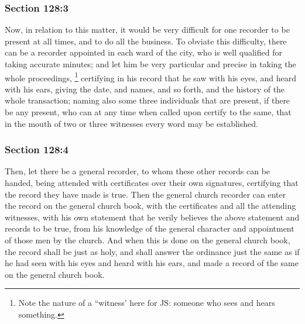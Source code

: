 
	\subsubsection{Section 128:3} %
		\label{DC128-3}

		Now, in relation to this matter, it would be very difficult for one recorder to be present at all times, and to do all the business. To obviate this difficulty, there can be a recorder appointed in each ward of the city, who is well qualified for taking accurate minutes; and let him be very particular and precise in taking the whole proceedings,
			\footnote{%
				Note the nature of a ``witness' here for JS: someone who sees and hears something.
				}%
		certifying in his record that he saw with his eyes, and heard with his ears, giving the date, and names, and so forth, and the history of the whole transaction; naming also some three individuals that are present, if there be any present, who can at any time when called upon certify to the same, that in the mouth of two or three witnesses every word may be established.


	\subsubsection{Section 128:4} %
		\label{DC128-4}

		Then, let there be a general recorder, to whom these other records can be handed, being attended with certificates over their own signatures, certifying that the record they have made is true. Then the general church recorder can enter the record on the general church book, with the certificates and all the attending witnesses, with his own statement that he verily believes the above statement and records to be true, from his knowledge of the general character and appointment of those men by the church. And when this is done on the general church book, the record shall be just as holy, and shall answer the ordinance just the same as if he had seen with his eyes and heard with his ears, and made a record of the same on the general church book.

